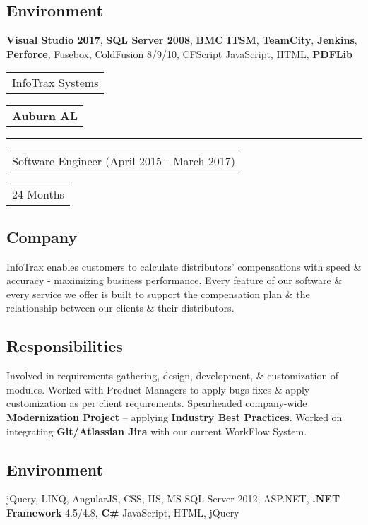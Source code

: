 \documentclass[letterpaper,11pt]{article}
\begin{document}
    \subsection{Environment}
    \textbf{Visual Studio 2017}, \textbf{SQL Server 2008}, \textbf{BMC ITSM}, \textbf{TeamCity}, \textbf{Jenkins}, \textbf{Perforce}, Fusebox,  ColdFusion 8/9/10, CFScript JavaScript, HTML, \textbf{PDFLib}


    \vspace{1.27cm}
    \noindent
    \begin{tabular}[t]{@{}l}
    \Large{InfoTrax Systems}
    \end{tabular}
    \hfill
    \begin{tabular}[t]{l@{}}
    \textbf{\color{darkgray}Auburn AL}
    \end{tabular}
    \noindent\rule{\textwidth}{0.5pt}
    \begin{tabular}[t]{@{}l}
    Software Engineer (April 2015 - March 2017)
    \end{tabular}
    \hfill
    \begin{tabular}[t]{l@{}}
    24 Months
    \end{tabular}

    \subsection{Company}
    InfoTrax enables customers to calculate distributors’ compensations with speed \& accuracy - maximizing business performance. Every feature of our software \& every service we offer is built to support the compensation plan \& the relationship between our clients \& their distributors.

    \subsection{Responsibilities}
    Involved in requirements gathering, design, development, \& customization of modules. Worked with Product Managers to apply bugs fixes \& apply customization as per client requirements. Spearheaded company-wide \textbf{\color{darkgray}Modernization Project} – applying \textbf{\color{darkgray}Industry Best Practices}. Worked on integrating \textbf{\color{darkgray}Git/Atlassian Jira} with our current WorkFlow System.

    \subsection{Environment}
    jQuery, LINQ, AngularJS, CSS, IIS, MS SQL Server 2012, ASP.NET, \textbf{\color{darkgray}.NET Framework} 4.5/4.8, \textbf{\color{darkgray}C\#} JavaScript, HTML, jQuery
    
\end{document}
